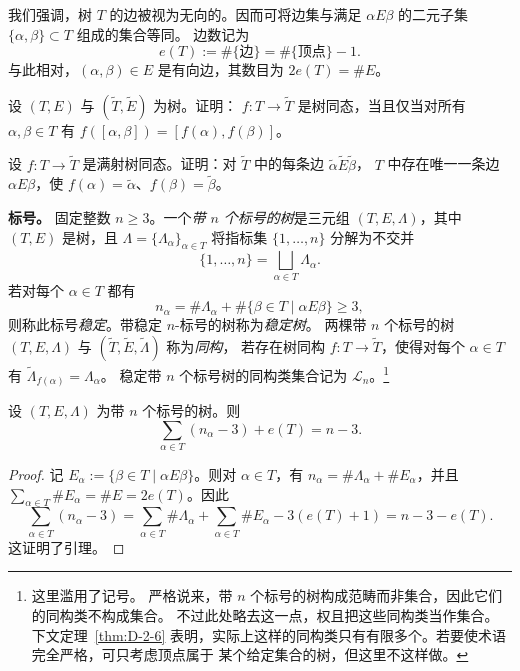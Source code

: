 我们强调，树 $T$ 的边被视为无向的。因而可将边集与满足
$\alpha E\beta$ 的二元子集 $\{\alpha,\beta\}\subset T$ 组成的集合等同。
边数记为
\[
  e(T):=\#\{\text{边}\}=\#\{\text{顶点}\}-1.
\]
与此相对，$(\alpha,\beta)\in E$ 是有向边，其数目为
$2e(T)=\#E$。

\begin{exercise}\label{ex:D-2-1}
设 $(T,E)$ 与 $(\widetilde T,\widetilde E)$ 为树。证明：
$f:T\to\widetilde T$ 是树同态，当且仅当对所有 $\alpha,\beta\in T$ 有
$f([\alpha,\beta])=[f(\alpha),f(\beta)]$。
\end{exercise}

\begin{exercise}\label{ex:D-2-2}
设 $f:T\to\widetilde T$ 是满射树同态。证明：对
$\widetilde T$ 中的每条边 $\widetilde\alpha\widetilde E\widetilde\beta$，
$T$ 中存在唯一一条边 $\alpha E\beta$，使
$f(\alpha)=\widetilde\alpha$、$f(\beta)=\widetilde\beta$。
\end{exercise}

\noindent\textbf{标号。}
固定整数 $n\ge3$。一个\emph{带 $n$ 个标号的树}是三元组
$(T,E,\Lambda)$，其中 $(T,E)$ 是树，且
$\Lambda=\{\Lambda_\alpha\}_{\alpha\in T}$ 将指标集
$\{1,\ldots,n\}$ 分解为不交并
\[
  \{1,\ldots,n\}=\bigsqcup_{\alpha\in T}\Lambda_\alpha.
\]
若对每个 $\alpha\in T$ 都有
\begin{equation}\label{eq:D-2-1}
  n_\alpha=\#\Lambda_\alpha
    +\#\{\beta\in T\mid\alpha E\beta\}\ge3,
\end{equation}
则称此标号\emph{稳定}。带稳定 $n$-标号的树称为\emph{稳定树}。
两棵带 $n$ 个标号的树 $(T,E,\Lambda)$ 与
$(\widetilde T,\widetilde E,\widetilde\Lambda)$ 称为\emph{同构}，
若存在树同构 $f:T\to\widetilde T$，使得对每个 $\alpha\in T$ 有
$\widetilde\Lambda_{f(\alpha)}=\Lambda_\alpha$。
稳定带 $n$ 个标号树的同构类集合记为 $\mathcal L_n$。\footnote{这里滥用了记号。
严格说来，带 $n$ 个标号的树构成范畴而非集合，因此它们的同构类不构成集合。
不过此处略去这一点，权且把这些同构类当作集合。下文定理~\ref{thm:D-2-6}
表明，实际上这样的同构类只有有限多个。若要使术语完全严格，可只考虑顶点属于
某个给定集合的树，但这里不这样做。}

\begin{lemma}\label{lem:D-2-3}
设 $(T,E,\Lambda)$ 为带 $n$ 个标号的树。则
\[
  \sum_{\alpha\in T}(n_\alpha-3)+e(T)=n-3.
\]
\end{lemma}
\begin{proof}
记 $E_\alpha:=\{\beta\in T\mid\alpha E\beta\}$。则对
$\alpha\in T$，有 $n_\alpha=\#\Lambda_\alpha+\#E_\alpha$，并且
$\sum_{\alpha\in T}\#E_\alpha=\#E=2e(T)$。因此
\[
  \sum_{\alpha\in T}(n_\alpha-3)
  =\sum_{\alpha\in T}\#\Lambda_\alpha
   +\sum_{\alpha\in T}\#E_\alpha-3(e(T)+1)
  =n-3-e(T).
\]
这证明了引理。
\end{proof}

